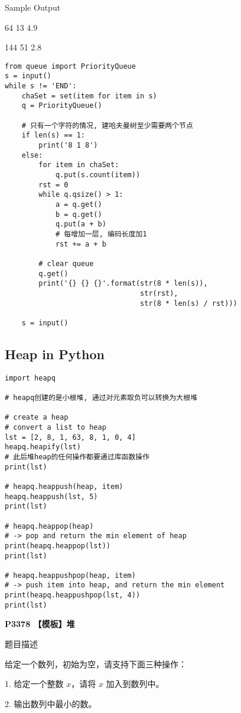 \documentclass[../main]{subfiles}
\begin{document}
Sample Output

64 13 4.9

144 51 2.8

\newpage
\begin{lstlisting}[style = Python]
from queue import PriorityQueue
s = input()
while s != 'END':
    chaSet = set(item for item in s)
    q = PriorityQueue()

    # 只有一个字符的情况, 建哈夫曼树至少需要两个节点
    if len(s) == 1:
        print('8 1 8')
    else:
        for item in chaSet:
            q.put(s.count(item))
        rst = 0
        while q.qsize() > 1:
            a = q.get()
            b = q.get()
            q.put(a + b)
            # 每增加一层, 编码长度加1
            rst += a + b
        
        # clear queue
        q.get()
        print('{} {} {}'.format(str(8 * len(s)),
                                str(rst),
                                str(8 * len(s) / rst)))

    s = input()
\end{lstlisting}

\subsection{Heap in Python}

\begin{lstlisting}[style = Python]
import heapq

# heapq创建的是小根堆, 通过对元素取负可以转换为大根堆

# create a heap
# convert a list to heap
lst = [2, 8, 1, 63, 8, 1, 0, 4]
heapq.heapify(lst)
# 此后堆heap的任何操作都要通过库函数操作
print(lst)

# heapq.heappush(heap, item)
heapq.heappush(lst, 5)
print(lst)

# heapq.heappop(heap)
# -> pop and return the min element of heap
print(heapq.heappop(lst))
print(lst)

# heapq.heappushpop(heap, item)
# -> push item into heap, and return the min element
print(heapq.heappushpop(lst, 4))
print(lst)
\end{lstlisting}

\textbf{P3378 【模板】堆}

题目描述

给定一个数列，初始为空，请支持下面三种操作：

1. 给定一个整数 $x$，请将 $x$ 加入到数列中。

2. 输出数列中最小的数。
\end{document}

